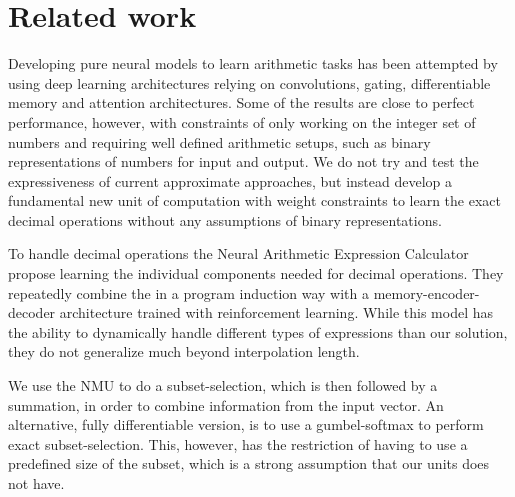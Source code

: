 \section{Related work}
Developing pure neural models to learn arithmetic tasks has been attempted by using deep learning architectures relying on convolutions, gating, differentiable memory and attention architectures\cite{NeuralGPU,GridLSTM,NTM}.
Some of the results are close to perfect performance, however, with constraints of only working on the integer set of numbers and requiring well defined arithmetic setups, such as binary representations of numbers for input and output.
We do not try and test the expressiveness of current approximate approaches, but instead develop a fundamental new unit of computation with weight constraints to learn the exact decimal operations without any assumptions of binary representations.

To handle decimal operations the Neural Arithmetic Expression Calculator\cite{NAEC} propose learning the individual components needed for decimal operations.
They repeatedly combine the in a program induction way with a memory-encoder-decoder architecture trained with reinforcement learning.
While this model has the ability to dynamically handle different types of expressions than our solution, they do not generalize much beyond interpolation length.

We use the NMU to do a subset-selection, which is then followed by a summation, in order to combine information from the input vector.
An alternative, fully differentiable version, is to use a gumbel-softmax to perform exact subset-selection\cite{DSS}.
This, however, has the restriction of having to use a predefined size of the subset, which is a strong assumption that our units does not have.


% 
